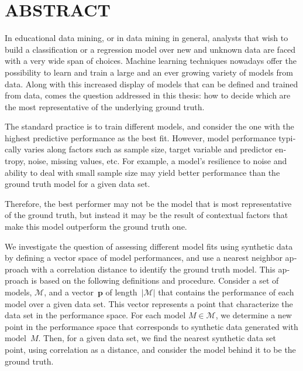 %

\chapter*{ABSTRACT}\thispagestyle{headings}
%
\begin{otherlanguage}{english}

In educational data mining, or in data mining in general, analysts that wish to build a classification or a regression model over new and unknown data are faced with a very wide span of choices.  Machine learning techniques nowadays offer the possibility to learn and train a large and an ever growing variety of models from data. Along with this increased display of models that can be defined and trained from data, comes the question addressed in this thesis: how to decide which are the most representative of the underlying ground truth.

The standard practice is to train different models, and consider the one with the highest predictive performance as the best fit. However, model performance typically varies along factors such as sample size, target variable and predictor entropy, noise, missing values, etc.  For example, a model's resilience to noise and ability to deal with small sample size may yield better performance than the ground truth model for a given data set.  

Therefore, the best performer may not be the model that is most representative of the ground truth, but instead it may be the result of contextual factors that make this model outperform the ground truth one.  

We investigate the question of assessing different model fits using synthetic data by defining a vector space of model performances, and use a nearest neighbor approach with a correlation distance to identify the ground truth model.  This approach is based on the following definitions and procedure.  Consider a set of models, $\mathcal{M}$, and a vector~$\mathbf{p}$ of length~$|\mathcal{M}|$ that contains the performance of each model over a given data set.  This vector represents a point that characterize the data set in the performance space.  For each model $M \in \mathcal{M}$, we determine a new point in the performance space that corresponds to synthetic data generated with model~$M$.  Then, for a given data set, we find the nearest synthetic data set point, using correlation as a distance, and consider the model behind it to be the ground truth.


\end{otherlanguage}
